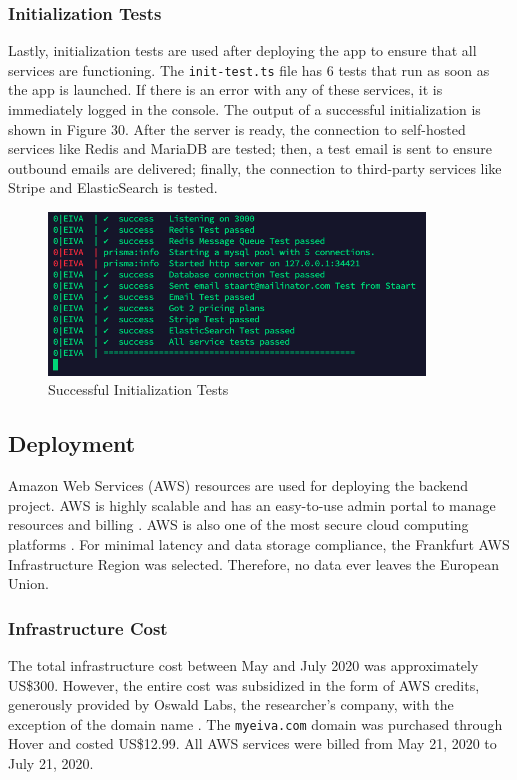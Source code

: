 \documentclass{article}
\begin{document}
\subsubsection{Initialization Tests}

Lastly, initialization tests are used after deploying the app to ensure that all services are functioning. The \texttt{init-test.ts} file has 6 tests that run as soon as the app is launched. If there is an error with any of these services, it is immediately logged in the console. The output of a successful initialization is shown in Figure 30. After the server is ready, the connection to self-hosted services like Redis and MariaDB are tested; then, a test email is sent to ensure outbound emails are delivered; finally, the connection to third-party services like Stripe and ElasticSearch is tested.

\begin{figure}[h]
	\center
	\includegraphics[width=10cm]{init-tests.png}
	\caption{Successful Initialization Tests}
\end{figure}

\subsection{Deployment}

Amazon Web Services (AWS) resources are used for deploying the backend project. AWS is highly scalable and has an easy-to-use admin portal to manage resources and billing \cite{shokeen_deploying_2019}. AWS is also one of the most secure cloud computing platforms \cite{narula_cloud_2015}. For minimal latency and data storage compliance, the Frankfurt AWS Infrastructure Region was selected. Therefore, no data ever leaves the European Union.

\subsubsection{Infrastructure Cost}

The total infrastructure cost between May and July 2020 was approximately US\$300. However, the entire cost was subsidized in the form of AWS credits, generously provided by Oswald Labs, the researcher's company, with the exception of the domain name \cite{noauthor_oswald_nodate}. The \texttt{myeiva.com} domain was purchased through Hover and costed US\$12.99. All AWS services were billed from May 21, 2020 to July 21, 2020.
\end{document}
